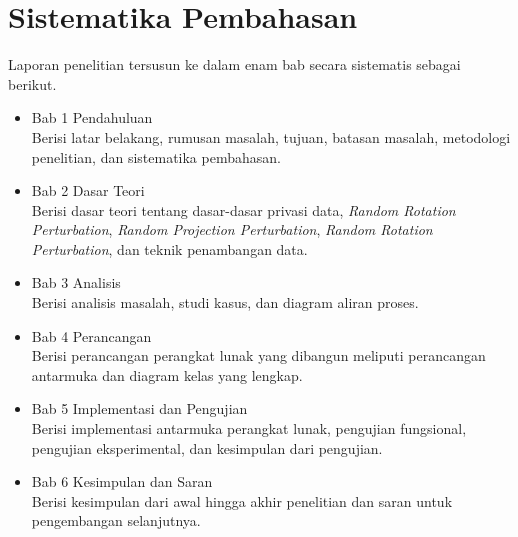 \section{Sistematika Pembahasan}
\label{sec:sispem}
Laporan penelitian tersusun ke dalam enam bab secara sistematis sebagai berikut.
\begin{itemize}
    \item Bab 1 Pendahuluan\\
    Berisi latar belakang, rumusan masalah, tujuan, batasan masalah, metodologi penelitian, dan sistematika pembahasan.
    \item Bab 2 Dasar Teori\\
    Berisi dasar teori tentang dasar-dasar privasi data, \textit{Random Rotation Perturbation}, \textit{Random Projection Perturbation}, \textit{Random Rotation Perturbation}, dan teknik penambangan data.
    \item Bab 3 Analisis\\
    Berisi analisis masalah, studi kasus, dan diagram aliran proses.
    \item Bab 4 Perancangan\\
    Berisi perancangan perangkat lunak yang dibangun meliputi perancangan antarmuka dan diagram kelas yang lengkap.
    \item Bab 5 Implementasi dan Pengujian\\
    Berisi implementasi antarmuka perangkat lunak, pengujian fungsional, pengujian eksperimental, dan kesimpulan dari pengujian.
    \item Bab 6 Kesimpulan dan Saran\\
    Berisi kesimpulan dari awal hingga akhir penelitian dan saran untuk pengembangan selanjutnya.
\end{itemize}